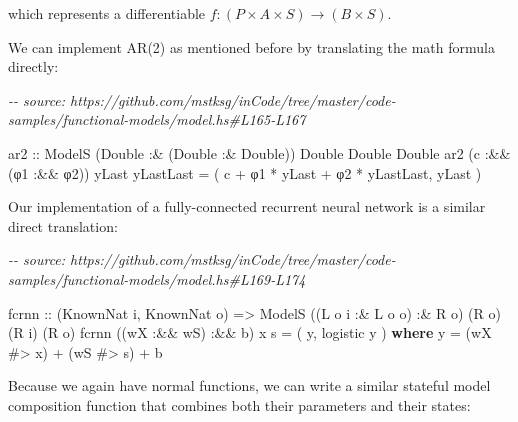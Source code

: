 \documentclass[]{article}
\newenvironment{Shaded}{}{}
\newcommand{\CommentTok}[1]{\textcolor[rgb]{0.38,0.63,0.69}{\textit{#1}}}
\newcommand{\DataTypeTok}[1]{\textcolor[rgb]{0.56,0.13,0.00}{#1}}
\newcommand{\KeywordTok}[1]{\textcolor[rgb]{0.00,0.44,0.13}{\textbf{#1}}}
\newcommand{\NormalTok}[1]{#1}
\newcommand{\OperatorTok}[1]{\textcolor[rgb]{0.40,0.40,0.40}{#1}}
\newcommand{\OtherTok}[1]{\textcolor[rgb]{0.00,0.44,0.13}{#1}}
\begin{document}
which represents a differentiable \(f : (P \times A \times S) \rightarrow (B
\times S)\).

We can implement AR(2) as mentioned before by translating the math formula
directly:

\begin{Shaded}
\begin{Highlighting}[]
\CommentTok{{-}{-} source: https://github.com/mstksg/inCode/tree/master/code{-}samples/functional{-}models/model.hs\#L165{-}L167}

\OtherTok{ar2 ::} \DataTypeTok{ModelS}\NormalTok{ (}\DataTypeTok{Double} \OperatorTok{:\&}\NormalTok{ (}\DataTypeTok{Double} \OperatorTok{:\&} \DataTypeTok{Double}\NormalTok{)) }\DataTypeTok{Double} \DataTypeTok{Double} \DataTypeTok{Double}
\NormalTok{ar2 (c }\OperatorTok{:\&\&}\NormalTok{ (φ1 }\OperatorTok{:\&\&}\NormalTok{ φ2)) yLast yLastLast }\OtherTok{=}
\NormalTok{    ( c }\OperatorTok{+}\NormalTok{ φ1 }\OperatorTok{*}\NormalTok{ yLast }\OperatorTok{+}\NormalTok{ φ2 }\OperatorTok{*}\NormalTok{ yLastLast, yLast )}
\end{Highlighting}
\end{Shaded}

Our implementation of a fully-connected recurrent neural network is a similar
direct translation:

\begin{Shaded}
\begin{Highlighting}[]
\CommentTok{{-}{-} source: https://github.com/mstksg/inCode/tree/master/code{-}samples/functional{-}models/model.hs\#L169{-}L174}

\NormalTok{fcrnn}
\OtherTok{    ::}\NormalTok{ (}\DataTypeTok{KnownNat}\NormalTok{ i, }\DataTypeTok{KnownNat}\NormalTok{ o)}
    \OtherTok{=\textgreater{}} \DataTypeTok{ModelS}\NormalTok{ ((}\DataTypeTok{L}\NormalTok{ o i }\OperatorTok{:\&} \DataTypeTok{L}\NormalTok{ o o) }\OperatorTok{:\&} \DataTypeTok{R}\NormalTok{ o) (}\DataTypeTok{R}\NormalTok{ o) (}\DataTypeTok{R}\NormalTok{ i) (}\DataTypeTok{R}\NormalTok{ o)}
\NormalTok{fcrnn ((wX }\OperatorTok{:\&\&}\NormalTok{ wS) }\OperatorTok{:\&\&}\NormalTok{ b) x s }\OtherTok{=}\NormalTok{ ( y, logistic y )}
  \KeywordTok{where}
\NormalTok{    y  }\OtherTok{=}\NormalTok{ (wX }\OperatorTok{\#\textgreater{}}\NormalTok{ x) }\OperatorTok{+}\NormalTok{ (wS }\OperatorTok{\#\textgreater{}}\NormalTok{ s) }\OperatorTok{+}\NormalTok{ b}
\end{Highlighting}
\end{Shaded}

Because we again have normal functions, we can write a similar stateful model
composition function that combines both their parameters and their states:
\end{document}
